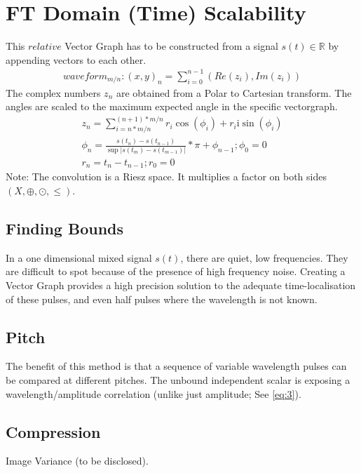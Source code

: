 \documentclass{report}
\begin{document}
\section{FT Domain (Time) Scalability}
This $relative$ Vector Graph has to be constructed from a signal $s(t)\in \mathbb{R}$ by appending vectors to each other.
\begin{align}
waveform_{m/n}: (x,y)_{n}=\sum \limits _{i=0}^{n-1}(Re(z_{i}),Im(z_{i}))
\end{align}
The complex numbers $z_{n}$ are obtained from a Polar to Cartesian transform. The angles are scaled to the maximum expected angle in the specific vectorgraph.
\begin{align}
z_{n}=\sum \limits _{i=n*m/n}^{(n+1)*m/n}r_{i}\cos(\phi_{i})+r_{i}\mathrm{i}\sin(\phi_{i})\\
\phi_{n}=\frac{s(t_{n})-s(t_{n-1})}{\sup \lvert s(t_{m})-s(t_{m-1}) \rvert}*\pi+\phi_{n-1};\phi_{0}=0\\
r_{n}=t_{n}-t_{n-1};r_{0}=0
\end{align}
Note: The convolution is a Riesz space. It multiplies a factor on both sides $(X,\oplus,\odot,\leq)$.
\subsection{Finding Bounds}
In a one dimensional mixed signal $s(t)$, there are quiet, low frequencies. They are difficult to spot because of the presence of high frequency noise. Creating a Vector Graph provides a high precision solution to the adequate time-localisation of these pulses, and even half pulses where the wavelength is not known.
\subsection{Pitch}
The benefit of this method is that a sequence of variable wavelength pulses can be compared at different pitches. The unbound independent scalar is exposing a wavelength/amplitude correlation (unlike just amplitude; See \eqref{eq:3}).
\subsection{Compression}
Image Variance (to be disclosed).
\end{document}
